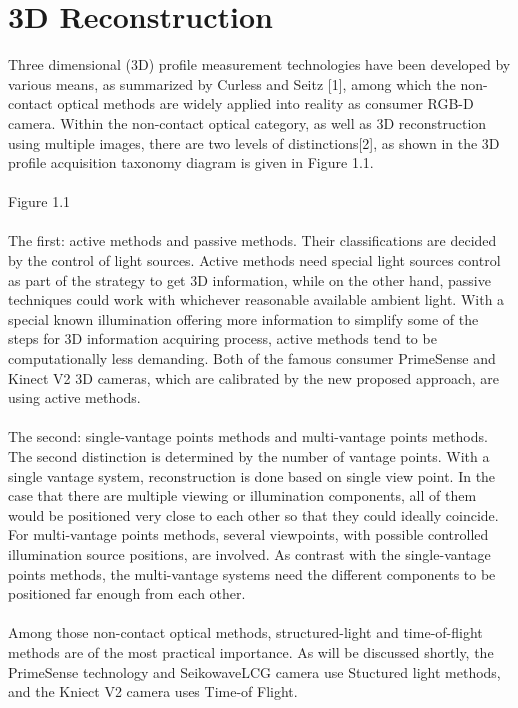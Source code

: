 \section{3D Reconstruction}
Three dimensional (3D) profile measurement technologies have been developed by various means, as summarized by Curless and Seitz [1], %
among which the non-contact optical methods are widely applied into reality as consumer RGB-D camera. Within the non-contact optical category, as well as 3D reconstruction using multiple images, there are two levels of distinctions[2],
 as shown in the 3D profile acquisition taxonomy diagram is given in Figure 1.1.%
 \\\\Figure 1.1
\\\\The first: active methods and passive methods. Their classifications are decided by the control of light sources. Active methods need special light sources control as part of the strategy to get 3D information, while on the other hand, passive techniques could work with whichever reasonable available ambient light. With a special known illumination offering more information to simplify some of the steps for 3D information acquiring process, active methods tend to be computationally less demanding. Both of the famous consumer PrimeSense and Kinect V2 3D cameras, which are calibrated by the new proposed approach, are using active methods.
\\\\The second: single-vantage points methods and multi-vantage points methods. The second distinction is determined by the number of vantage points. With a single vantage system, reconstruction is done based on single view point. In the case that there are multiple viewing or illumination components, all of them would be positioned very close to each other so that they could ideally coincide. For multi-vantage points methods, several viewpoints, with possible controlled illumination source positions, are involved. As contrast with the single-vantage points methods, the multi-vantage systems need the different components to be positioned far enough from each other. 
\\ \\
Among those non-contact optical methods, structured-light and time-of-flight methods are of the most practical importance.
As will be discussed shortly, the PrimeSense technology and SeikowaveLCG camera use Stuctured light methods, and the Kniect V2 camera uses Time-of Flight. 
